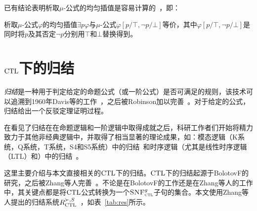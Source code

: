 已有结论表明析取$\mu$-公式的均匀插值是容易计算的~\cite{d2006modal}，即：
\begin{theorem}%
	析取$\mu$-公式$\varphi$的均匀插值$\exists p \varphi$与$\mu$-公式$\varphi[p/\top, \neg p/ \bot]$等价，其中$\varphi[p/\top, \neg p/ \bot]$是同时将$p$及其否定$\neg p$分别用$\top$和$\bot$替换得到。
\end{theorem}




\section{$\textrm{CTL}$下的归结}\label{chapter02:CTLres}

\emph{归结}是一种用于判定给定的命题公式（或一阶公式）是否可满足的规则，该技术可以追溯到1960年Davis等的工作~\cite{DBLP:journals/jacm/DavisP60}，之后被Robinson加以完善~\cite{DBLP:journals/jacm/Robinson65}。对于给定的公式，归结给出一个反驳定理证明过程。

在看见了归结在在命题逻辑和一阶逻辑中取得成就之后，科研工作者们开始将精力致力于其他非经典逻辑中，并取得了相当显著的理论成果，如：模态逻辑（K系统，Q系统，T系统，S4和S5系统）中的归结~\cite{DBLP:journals/tcs/EnjalbertC89}和时序逻辑（尤其是线性时序逻辑（LTL）和\CTL）中的归结~\cite{DBLP:conf/cade/CavalliC84,DBLP:journals/jetai/BolotovF99}。

这里主要介绍与本文直接相关的$\textrm{CTL}$下的归结。$\textrm{CTL}$下的归结起源于BolotovF的研究\cite{DBLP:journals/jetai/BolotovF99}，之后被Zhang等人完善~\cite{zhang2014resolution}。不论是在BolotovF的工作还是在Zhang等人的工作中，其关键点都是将$\textrm{CTL}$公式转换为一个${\textsc{SNF}_{\textsc{ctl}}^g}$子句的集合。本文使用Zhang等人提出的归结系统$R_{\textrm{CTL}}^{\succ,S}$~\cite{zhang2014resolution}，如表~\ref{tab:res}所示。

